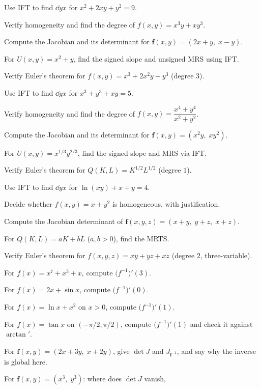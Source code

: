 \begin{problems}
  \item Use IFT to find $\dd{y}{x}$ for $x^{2}+2xy+y^{2}=9$.
  \item Verify homogeneity and find the degree of $f(x,y)=x^{3}y+xy^{3}$.
  \item Compute the Jacobian and its determinant for
        $\mathbf{f}(x,y)=(2x+y,\;x-y)$.
  \item For $U(x,y)=x^{2}+y$, find the signed slope and unsigned MRS
        using IFT.
  \item Verify Euler's theorem for $f(x,y)=x^{3}+2x^{2}y-y^{3}$
        (degree $3$).
  \item Use IFT to find $\dd{y}{x}$ for $x^{3}+y^{3}+xy=5$.
  \item Verify homogeneity and find the degree of
        $f(x,y)=\dfrac{x^{4}+y^{4}}{x^{2}+y^{2}}$.
  \item Compute the Jacobian and its determinant for
        $\mathbf{f}(x,y)=(x^{2}y,\;xy^{2})$.
  \item For $U(x,y)=x^{1/3}y^{2/3}$, find the signed slope and MRS via
        IFT.
  \item Verify Euler's theorem for $Q(K,L)=K^{1/2}L^{1/2}$ (degree $1$).
  \item Use IFT to find $\dd{y}{x}$ for $\ln(xy)+x+y=4$.
  \item Decide whether $f(x,y)=x+y^{2}$ is homogeneous, with
        justification.
  \item Compute the Jacobian determinant of
        $\mathbf{f}(x,y,z)=(x+y,\;y+z,\;x+z)$.
  \item For $Q(K,L)=aK+bL$ ($a,b>0$), find the MRTS.
  \item Verify Euler's theorem for $f(x,y,z)=xy+yz+xz$ (degree $2$,
        three-variable).
  \item For $f(x)=x^{7}+x^{3}+x$, compute $\bigl(f^{-1}\bigr)'(3)$.
  \item For $f(x)=2x+\sin x$, compute $\bigl(f^{-1}\bigr)'(0)$.
  \item For $f(x)=\ln x+x^{2}$ on $x>0$, compute $\bigl(f^{-1}\bigr)'(1)$.
  \item For $f(x)=\tan x$ on $(-\pi/2,\pi/2)$, compute
        $\bigl(f^{-1}\bigr)'(1)$ and check it against $\arctan'$.
  \item For $\mathbf{f}(x,y)=(2x+3y,\;x+2y)$, give $\det J$ and
        $J_{\mathbf{f}^{-1}}$, and say why the inverse is global here.
  \item For $\mathbf{f}(x,y)=(x^{3},\;y^{3})$: where does $\det J$ vanish,

\end{problems}
